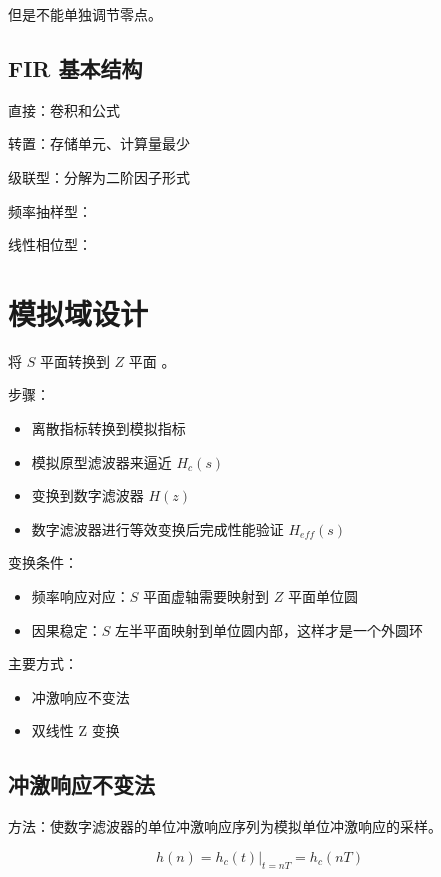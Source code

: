 \documentclass[cn,11pt,chinese,black,simple]{elegantbook}
\begin{document}
但是不能单独调节零点。

\subsection{FIR 基本结构}

直接：卷积和公式

转置：存储单元、计算量最少

级联型：分解为二阶因子形式

频率抽样型：

线性相位型：

\section{模拟域设计}

将 \(S\) 平面转换到 \(Z\) 平面 。

步骤：

\begin{itemize}
    \item 离散指标转换到模拟指标
    \item 模拟原型滤波器来逼近 \(H_c(s)\)
    \item 变换到数字滤波器 \(H(z)\)
    \item 数字滤波器进行等效变换后完成性能验证 \(H_{eff}(s)\)
\end{itemize}

变换条件：

\begin{itemize}
    \item 频率响应对应：\(S\) 平面虚轴需要映射到 \(Z\) 平面单位圆
    \item 因果稳定：\(S\) 左半平面映射到单位圆内部，这样才是一个外圆环
\end{itemize}

主要方式：

\begin{itemize}
    \item 冲激响应不变法
    \item 双线性 Z 变换
\end{itemize}


\subsection{冲激响应不变法}


方法：使数字滤波器的单位冲激响应序列为模拟单位冲激响应的采样。


\[
h(n)=\left.h_{c}(t)\right|_{t=n T}=h_{c}(n T)
\]
\end{document}
